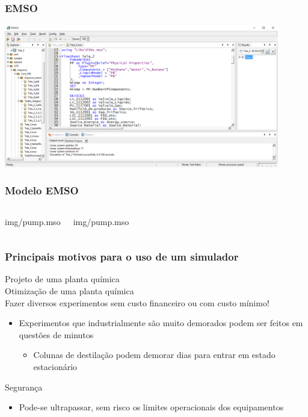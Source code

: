 \documentclass[aspectratio=169]{beamer}
\begin{document}
\begin{frame}
	\frametitle{EMSO}
	\begin{center}
		\includegraphics[width=0.9\textwidth]{img/EMSO_2.PNG}
	\end{center}
\end{frame}

\begin{frame}
	\frametitle{Modelo EMSO}
	\footnotesize
		\begin{columns}[t] 
				 
				 {img/pump.mso}

				 
				 {img/pump.mso}
		\end{columns}
\end{frame}
 
\begin{frame}
	\frametitle{Principais motivos para o uso de um simulador}
	Projeto de uma planta química\\
	Otimização de uma planta química\\
	Fazer diversos experimentos sem custo financeiro ou com custo mínimo!
	\begin{itemize}
		\item Experimentos que industrialmente são muito demorados podem ser feitos em
		questões de minutos
			\begin{itemize}
				\item Colunas de destilação podem demorar dias para entrar
				em estado estacionário
		\end{itemize}
	\end{itemize}
	Segurança
	\begin{itemize}
		\item Pode-se ultrapassar, sem risco os limites operacionais dos equipamentos
	\end{itemize}
\end{frame}
 
\end{document}

